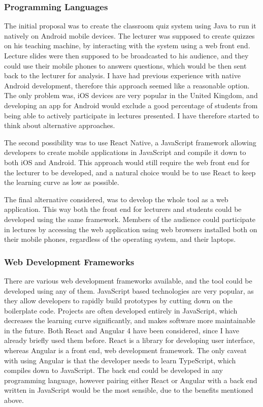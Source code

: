 \subsubsection{Programming Languages}
The initial proposal was to create the classroom quiz system using Java\cite{3} to run it natively
on Android\cite{4} mobile devices. The lecturer was supposed to create quizzes on his teaching
machine, by interacting with the system using a web front end. Lecture slides were then supposed
to be broadcasted to his audience, and they could use their mobile phones to answers questions,
which would be then sent back to the lecturer for analysis. I have had previous experience with
native Android development, therefore this approach seemed like a reasonable option. The only problem was,
iOS\cite{5} devices are very popular in the United Kingdom, and developing an app for Android would exclude
a good percentage of students from being able to actively participate in lectures presented. I have
therefore started to think about alternative approaches.

The second possibility was to use React Native\cite{6}, a JavaScript\cite{7} framework allowing
developers to create mobile applications in JavaScript and compile it down to both iOS and Android.
This approach would still require the web front end for the lecturer to be developed, and a natural
choice would be to use React\cite{8} to keep the learning curve as low as possible.

The final alternative considered, was to develop the whole tool as a web application. This way both the
front end for lecturers and students could be developed using the same framework. Members of the audience
could participate in lectures by accessing the web application using web browsers installed
both on their mobile phones, regardless of the operating system, and their laptops.

\subsubsection{Web Development Frameworks}
There are various web development frameworks available, and the tool could be developed using
any of them. JavaScript based technologies are very popular, as they allow developers to
rapidly build prototypes by cutting down on the boilerplate code. Projects are often developed
entirely in JavaScript, which decreases the learning curve significantly, and makes software
more maintainable in the future. Both React and Angular 4\cite{9} have been considered,
since I have already briefly used them before. React is a library
for developing user interface, whereas Angular is a front end, web development framework. The only caveat with
using Angular is that the developer needs to learn TypeScript\cite{10}, which compiles down to JavaScript.
The back end could be developed in any programming language, however pairing either React or
Angular with a back end written in JavaScript would be the most sensible, due to the benefits
mentioned above.

